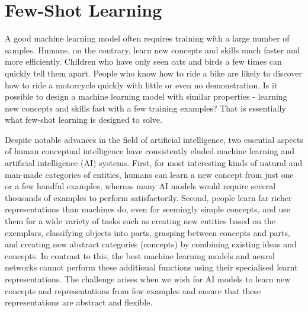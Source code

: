 \chapter{Few-Shot Learning}\label{chap:fsl}
A good machine learning model often requires training with a large number of samples. Humans, on the contrary, learn new concepts and skills much faster and more efficiently. Children who have only seen cats and birds a few times can quickly tell them apart. People who know how to ride a bike are likely to discover how to ride a motorcycle quickly with little or even no demonstration. Is it possible to design a machine learning model with similar properties - learning new concepts and skills fast with a few training examples? That is essentially what few-shot learning is designed to solve.

Despite notable advances in the field of artificial intelligence, two essential aspects of human conceptual intelligence have consistently eluded machine learning and artificial intelligence (AI) systems. First, for most interesting kinds of natural and man-made categories of entities, humans can learn a new concept from just one or a few handful examples, whereas many AI models would require several thousands of examples to perform satisfactorily. Second, people learn far richer representations than machines do, even for seemingly simple concepts, and use them for a wide variety of tasks such as creating new entities based on the exemplars, classifying objects into parts, grasping between concepts and parts, and creating new abstract categories (concepts) by combining existing ideas and concepts. In contrast to this, the best machine learning models and neural networks cannot perform these additional functions using their specialised learnt representations. The challenge arises when we wish for AI models to learn new concepts and representations from few examples and ensure that these representations are abstract and flexible.